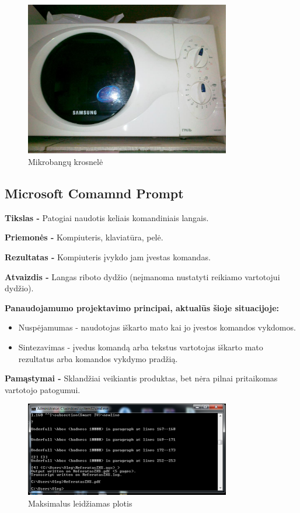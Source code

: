 ﻿\documentclass[a4paper, 12pt]{article}
\begin{document}
		\begin{figure}[h]
		\centering
		\includegraphics[width=0.8\textwidth]{images/mikrobange.jpg}
		\caption{Mikrobangų krosnelė}
		\label{overflow}
		\end{figure}		
	\subsection{Microsoft Comamnd Prompt}
		\textbf{Tikslas -}
		Patogiai naudotis keliais komandiniais langais.
		
		\textbf{Priemonės -}
		Kompiuteris, klaviatūra, pelė.
		
		\textbf{Rezultatas -}
		Kompiuteris įvykdo jam įvestas komandas.	
		
		\textbf{Atvaizdis -}
		Langas riboto dydžio (neįmanoma nustatyti reikiamo vartotojui dydžio).

		\textbf{Panaudojamumo projektavimo principai, aktualūs šioje situacijoje:}
		\begin{itemize}
		\item Nuspėjamumas - naudotojas iškarto mato kai jo įvestos komandos vykdomos.
		\item Sintezavimas - įvedus komandą arba tekstus vartotojas iškarto mato rezultatus arba komandos vykdymo pradžią.
		\end{itemize}

		\textbf{Pamąstymai -}
		Sklandžiai veikiantis produktas, bet nėra pilnai pritaikomas vartotojo patogumui.
		\begin{figure}[h]
		\centering
		\includegraphics[width=0.8\textwidth]{images/command-prompt.png}
		\caption{Maksimalus leidžiamas plotis}
		\label{overflow}
		\end{figure}
\end{document}
